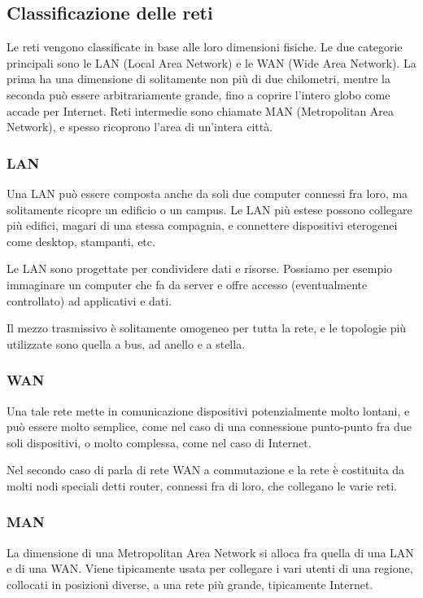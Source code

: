     \subsection{Classificazione delle reti}
        Le reti vengono classificate in base alle loro dimensioni fisiche. Le due categorie principali sono le LAN (Local Area Network) e le WAN (Wide Area Network). La prima ha una dimensione di solitamente non più di due chilometri, mentre la seconda può essere arbitrariamente grande, fino a coprire l'intero globo come accade per Internet. Reti intermedie sono chiamate MAN (Metropolitan Area Network), e spesso ricoprono l'area di un'intera città.
            
        \subsubsection{LAN}
            Una LAN può essere composta anche da soli due computer connessi fra loro, ma solitamente ricopre un edificio o un campus. Le LAN più estese possono collegare più edifici, magari di una stessa compagnia, e connettere dispositivi eterogenei come desktop, stampanti, etc.
                
            Le LAN sono progettate per condividere dati e risorse. Possiamo per esempio immaginare un computer che fa da server e offre accesso (eventualmente controllato) ad applicativi e dati.
                
            Il mezzo trasmissivo è solitamente omogeneo per tutta la rete, e le topologie più utilizzate sono quella a bus, ad anello e a stella.
                
        \subsubsection{WAN}
            Una tale rete mette in comunicazione dispositivi potenzialmente molto lontani, e può essere molto semplice, come nel caso di una connessione punto-punto fra due soli dispositivi, o molto complessa, come nel caso di Internet.
                
            Nel secondo caso di parla di rete WAN a commutazione e la rete è costituita da molti nodi speciali detti router, connessi fra di loro, che collegano le varie reti.
                
        \subsubsection{MAN}
            La dimensione di una Metropolitan Area Network si alloca fra quella di una LAN e di una WAN. Viene tipicamente usata per collegare i vari utenti di una regione, collocati in posizioni diverse, a una rete più grande, tipicamente Internet.
                
